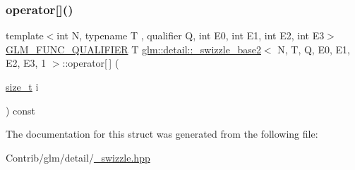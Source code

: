 \subsubsection{\texorpdfstring{operator[]()}{operator[]()}}
{\footnotesize\ttfamily template$<$int N, typename T , qualifier Q, int E0, int E1, int E2, int E3$>$ \\
\mbox{\hyperlink{setup_8hpp_a33fdea6f91c5f834105f7415e2a64407}{G\+L\+M\+\_\+\+F\+U\+N\+C\+\_\+\+Q\+U\+A\+L\+I\+F\+I\+ER}} T \mbox{\hyperlink{structglm_1_1detail_1_1__swizzle__base2}{glm\+::detail\+::\+\_\+swizzle\+\_\+base2}}$<$ N, T, Q, E0, E1, E2, E3, 1 $>$\+::operator\mbox{[}$\,$\mbox{]} (\begin{DoxyParamCaption}\item[{\mbox{\hyperlink{_s_d_l__config__winrt_8h_a7c94ea6f8948649f8d181ae55911eeaf}{size\+\_\+t}}}]{i }\end{DoxyParamCaption}) const\hspace{0.3cm}{\ttfamily [inline]}}



The documentation for this struct was generated from the following file\+:\begin{DoxyCompactItemize}
\item 
Contrib/glm/detail/\mbox{\hyperlink{__swizzle_8hpp}{\+\_\+swizzle.\+hpp}}\end{DoxyCompactItemize}
